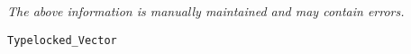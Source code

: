 \label{pkg:vector\_of\_chars}

{\tiny \it The above information is manually maintained and may contain errors.}
\begin{verbatim}
Typelocked_Vector
\end{verbatim}
